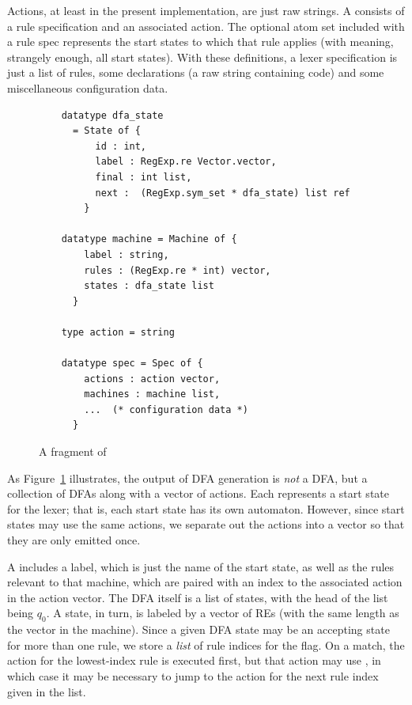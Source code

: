 Actions, at least in the present implementation, are just raw strings.  A
 consists of a rule specification and an associated action.  The
optional atom set included with a rule spec represents the start states
to which that rule applies (with  meaning, strangely enough, all start
states).  With these definitions, a lexer specification is just a list of
rules, some declarations (a raw string containing code) and some miscellaneous
configuration data.

\begin{figure}
\begin{verbatim}
    datatype dfa_state
      = State of {
          id : int,
          label : RegExp.re Vector.vector,
          final : int list,
          next :  (RegExp.sym_set * dfa_state) list ref
        }

    datatype machine = Machine of {
        label : string,
        rules : (RegExp.re * int) vector,
        states : dfa_state list
      }

    type action = string

    datatype spec = Spec of {
        actions : action vector,
        machines : machine list,
        ...  (* configuration data *)
      }
\end{verbatim}
\caption{A fragment of }\label{fig:lex-output-spec}
\end{figure}

As Figure~\ref{fig:lex-output-spec} illustrates, the output of DFA generation is
\emph{not} a DFA, but a collection of DFAs along with a vector of actions. 
Each  represents a start state for the lexer; that is, each start
state has its own automaton.  However, since start states may use the same
actions, we separate out the actions into a vector so that they are only
emitted once.

A  includes a label, which is just the name of the start state, as
well as the rules relevant to that machine, which are paired with an index to
the associated action in the action vector.  The DFA itself is a list of
states, with the head of the list being $q_0$.  A state, in turn, is labeled by
a vector of REs (with the same length as the  vector in the machine).
 Since a given DFA state may be an accepting state for more than one rule, we
store a \emph{list} of rule indices for the  flag.  On a match, the
action for the lowest-index rule is executed first, but that action may use
, in which case it may be necessary to jump to the action for the
next rule index given in the  list.

